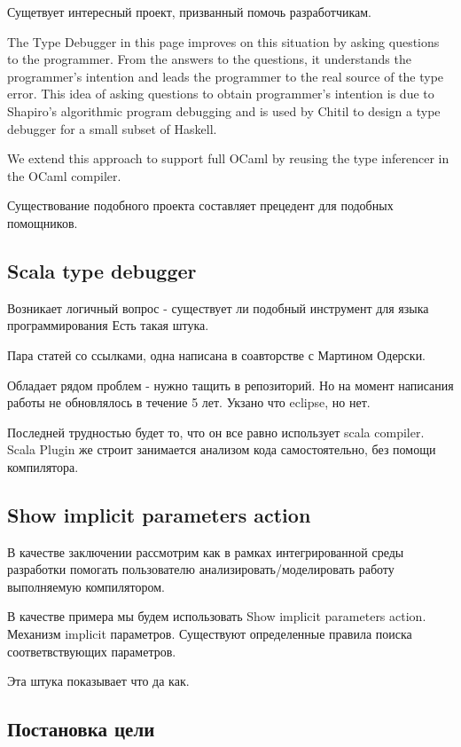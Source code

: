 Сущетвует интересный проект, призванный помочь разработчикам.

The Type Debugger in this page improves on this situation by asking
questions to the programmer. From the answers to the questions, it understands
the programmer's intention and leads the programmer to the real source of the
type error. This idea of asking questions to obtain programmer's intention is
due to Shapiro's algorithmic program debugging and is used by Chitil to design
a type debugger for a small subset of Haskell.

We extend this approach to
support full OCaml by reusing the type inferencer in the OCaml compiler.

Существование подобного проекта составляет прецедент для подобных помощников.

\subsection{Scala type debugger}
\label{sec:typeDebugger}

Возникает логичный вопрос - существует ли подобный инструмент для языка
программирования
Есть такая штука.

Пара статей со ссылками, одна написана в соавторстве с Мартином Одерски.

Обладает рядом проблем - нужно тащить в репозиторий.
Но на момент написания работы не обновлялось в течение 5 лет.
Укзано что eclipse, но нет.

Последней трудностью будет то, что он все равно использует scala compiler.
Scala Plugin же строит занимается анализом кода самостоятельно,
без помощи компилятора.

\subsection{Show implicit parameters action}
\label{sec:showImplicit}

В качестве заключении рассмотрим как в рамках интегрированной среды
разработки помогать пользователю анализировать/моделировать работу выполняемую
компилятором.

В качестве примера мы будем использовать Show implicit parameters action.
Механизм implicit параметров.
Существуют определенные правила поиска соответвствующих параметров.

Эта штука показывает что да как.

\subsection{Постановка цели}

